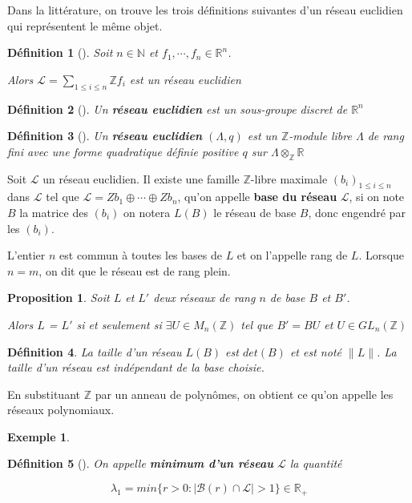\documentclass[a4paper,12pt]{report}  %
\theoremstyle{definitionstyle}
\newtheorem{definition}{Définition}[chapter] %
\theoremstyle{examplestyle}
\newtheorem{example}{Exemple}[chapter] %
\theoremstyle{remarkstyle}
\theoremstyle{propositionstyle}
\newtheorem{proposition}{Proposition}[chapter]  %
\theoremstyle{theoremstyle}
\theoremstyle{proofstyle}
\begin{document}
	
	Dans la littérature, on trouve les trois définitions suivantes d’un réseau euclidien qui représentent le même objet.
	
	\begin{definition}[\cite{MCA}]
		Soit $n \in \mathbb{N}$ et $f_1, \cdots, f_n \in \mathbb{R}^n$.
		
		Alors $\mathcal{L} = \sum_{1 \leq i \leq n} \mathbb{Z} f_i
		$ est un réseau euclidien
	\end{definition}

	\begin{definition}[\cite{Wallet}]
		Un \textbf{réseau euclidien} est un sous-groupe discret de $\mathbb{R}^n$
	\end{definition}

	\begin{definition}[\cite{clef_unique_2}]
		Un \textbf{réseau euclidien} $(\Lambda, q)$ est un $\mathbb{Z}$-module libre $\Lambda$ de rang fini avec une forme quadratique définie positive $q$ sur $\Lambda \otimes_\mathbb{Z} \mathbb{R}$ 
	\end{definition}
	
	Soit $\mathcal{L}$ un réseau euclidien. Il existe une famille $\mathbb{Z}$-libre maximale $(b_i)_{1 \leq i \leq n}$ dans $\mathcal{L}$ tel que $\mathcal{L} = Zb_1 \oplus \cdots \oplus Zb_n$, qu'on appelle \textbf{base du réseau} $\mathcal{L}$, si on note $B$ la matrice des $(b_i)$ on notera $L(B)$ le réseau de base $B$, donc engendré par les $(b_i)$.
	
	L'entier $n$ est commun à toutes les bases de $L$ et on l'appelle rang de $L$. Lorsque $n=m$, on dit que le réseau est de rang plein.
	
	\begin{proposition}%
		Soit $L$ et $L'$ deux réseaux de rang $n$ de base $B$ et $B'$.
		
		Alors $L$ = $L'$ si et seulement si $\exists U \in M_n(\mathbb{Z})$ tel que $B'=BU$ et $U \in GL_n(\mathbb{Z})$
	\end{proposition}
	
	\begin{definition}
		La taille d'un réseau $L(B)$ est $det(B)$ et est noté $\|L\|$. La taille d'un réseau est indépendant de la base choisie.
	\end{definition} 
	
	En substituant $\mathbb{Z}$ par un anneau de polynômes, on obtient ce qu'on appelle les réseaux polynomiaux.
	
	\begin{example}
		
	\end{example}
	\begin{definition}[\cite{Wallet}]
		On appelle \textbf{minimum d'un réseau} $\mathcal{L}$ la quantité
		
		$$\lambda_1 = min\{r>0 : |\mathcal{B}(r)\cap\mathcal{L}|>1\} \in \mathbb{R_+}$$
	\end{definition}
	
\end{document}
